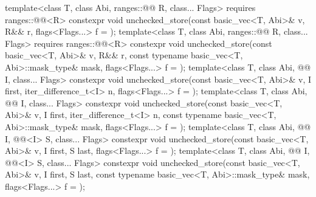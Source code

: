\begin{codeblock}
{  template<class T, class Abi, ranges::@@ R, class... Flags>
    requires ranges::@@<R>
    constexpr void unchecked_store(const basic_vec<T, Abi>& v, R&& r,
                                   flags<Flags...> f = {});
  template<class T, class Abi, ranges::@@ R, class... Flags>
    requires ranges::@@<R>
    constexpr void unchecked_store(const basic_vec<T, Abi>& v, R&& r,
                                   const typename basic_vec<T, Abi>::mask_type& mask,
                                   flags<Flags...> f = {});
  template<class T, class Abi, @@ I, class... Flags>
    constexpr void unchecked_store(const basic_vec<T, Abi>& v, I first,
                                   iter_difference_t<I> n, flags<Flags...> f = {});
  template<class T, class Abi, @@ I, class... Flags>
    constexpr void unchecked_store(const basic_vec<T, Abi>& v, I first,
      iter_difference_t<I> n, const typename basic_vec<T, Abi>::mask_type& mask,
      flags<Flags...> f = {});
  template<class T, class Abi, @@ I, @@<I> S, class... Flags>
    constexpr void unchecked_store(const basic_vec<T, Abi>& v, I first, S last,
                                   flags<Flags...> f = {});
  template<class T, class Abi, @@ I, @@<I> S, class... Flags>
    constexpr void unchecked_store(const basic_vec<T, Abi>& v, I first, S last,
                                   const typename basic_vec<T, Abi>::mask_type& mask,
                                   flags<Flags...> f = {});

}
\end{codeblock}
